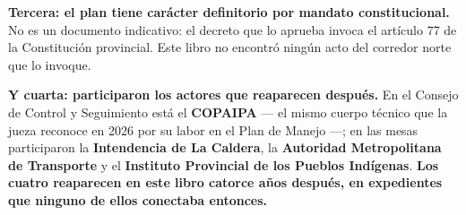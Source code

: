 \textbf{Tercera: el plan tiene carácter definitorio por mandato constitucional.} No es un
documento indicativo: el decreto que lo aprueba invoca el artículo 77 de la Constitución
provincial. Este libro no encontró ningún acto del corredor norte que lo invoque.

\textbf{Y cuarta: participaron los actores que reaparecen después.} En el Consejo de Control y
Seguimiento está el \textbf{COPAIPA} --- el mismo cuerpo técnico que la jueza reconoce en
2026 por su labor en el Plan de Manejo ---; en las mesas participaron la \textbf{Intendencia
de La Caldera}, la \textbf{Autoridad Metropolitana de Transporte} y el \textbf{Instituto
Provincial de los Pueblos Indígenas}. \textbf{Los cuatro reaparecen en este libro catorce años
después, en expedientes que ninguno de ellos conectaba entonces.}

